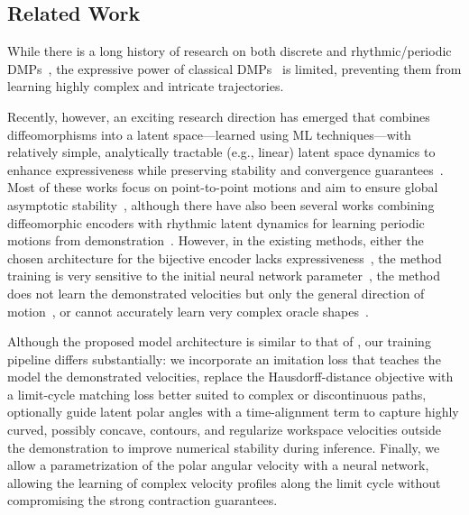 \subsection{Related Work}
While there is a long history of research on both discrete and rhythmic/periodic \glspl{DMP}~\citep{ijspeert2002learning, kober2009learning, ijspeert2013dynamical, wensing2017sparse, kramberger2018passivity, saveriano2023dynamic, abu2024learning, hu2024fusion, nah2025combining}, the expressive power of classical \glspl{DMP}~\citep{ijspeert2002learning, kober2009learning, ijspeert2013dynamical, wensing2017sparse} is limited, preventing them from learning highly complex and intricate trajectories.

Recently, however, an exciting research direction has emerged that combines diffeomorphisms into a latent space—learned using ML techniques—with relatively simple, analytically tractable (e.g., linear) latent space dynamics to enhance expressiveness while preserving stability and convergence guarantees~\citep{rana2020euclideanizing, urain2020imitationflow, zhang2022learning, perez2023stable}. Most of these works focus on point-to-point motions and aim to ensure global asymptotic stability~\citep{rana2020euclideanizing, zhang2022learning, perez2023stable, perez2024puma}, although there have also been several works combining diffeomorphic encoders with rhythmic latent dynamics for learning periodic motions from demonstration~\citep{urain2020imitationflow, khadivar2021learning, zhi2024teaching}.
However, in the existing methods, either the chosen architecture for the bijective encoder lacks expressiveness~\citep{urain2020imitationflow, khadivar2021learning}, the method training is very sensitive to the initial neural network parameter~\citep{urain2020imitationflow}, the method does not learn the demonstrated velocities but only the general direction of motion~\citep{zhi2024teaching}, or cannot accurately learn very complex oracle shapes~\citep{zhi2024teaching}.

Although the proposed model architecture is similar to that of \citet{zhi2024teaching}, our training pipeline differs substantially: we incorporate an imitation loss that teaches the model the demonstrated velocities, replace the Hausdorff-distance objective with a limit-cycle matching loss better suited to complex or discontinuous paths, optionally guide latent polar angles with a time-alignment term to capture highly curved, possibly concave, contours, and regularize workspace velocities outside the demonstration to improve numerical stability during inference. 
Finally, we allow a parametrization of the polar angular velocity with a neural network, allowing the learning of complex velocity profiles along the limit cycle without compromising the strong contraction guarantees. 

